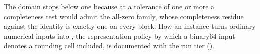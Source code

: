 
The domain stops below one because at a tolerance of one or more a
completeness test would admit the all-zero family, whose completeness residue
against the identity is exactly one on every block. How an instance turns
ordinary numerical inputs into , the
representation policy by which a binary64 input denotes a rounding cell
included, is documented with the run tier
().

